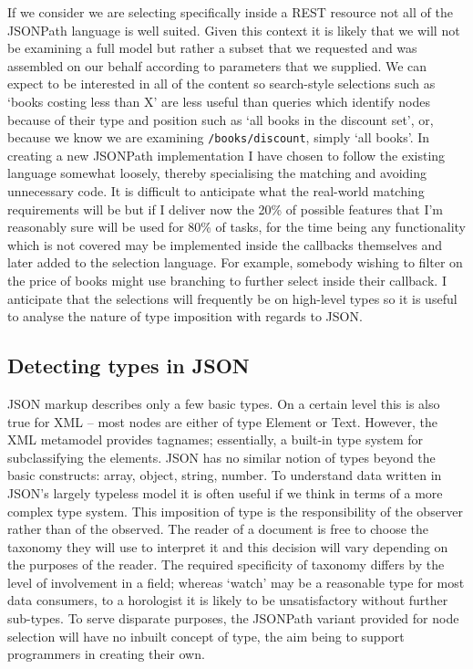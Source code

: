 \documentclass[12pt, ]{article}
\begin{document}
If we consider we are selecting specifically inside a REST resource not
all of the JSONPath language is well suited. Given this context it is
likely that we will not be examining a full model but rather a subset
that we requested and was assembled on our behalf according to
parameters that we supplied. We can expect to be interested in all of
the content so search-style selections such as `books costing less than
X' are less useful than queries which identify nodes because of their
type and position such as `all books in the discount set', or, because
we know we are examining \texttt{/books/discount}, simply `all books'.
In creating a new JSONPath implementation I have chosen to follow the
existing language somewhat loosely, thereby specialising the matching
and avoiding unnecessary code. It is difficult to anticipate what the
real-world matching requirements will be but if I deliver now the 20\%
of possible features that I'm reasonably sure will be used for 80\% of
tasks, for the time being any functionality which is not covered may be
implemented inside the callbacks themselves and later added to the
selection language. For example, somebody wishing to filter on the price
of books might use branching to further select inside their callback. I
anticipate that the selections will frequently be on high-level types so
it is useful to analyse the nature of type imposition with regards to
JSON.

\subsection{Detecting types in JSON}\label{detecting-types-in-json}

JSON markup describes only a few basic types. On a certain level this is
also true for XML -- most nodes are either of type Element or Text.
However, the XML metamodel provides tagnames; essentially, a built-in
type system for subclassifying the elements. JSON has no similar notion
of types beyond the basic constructs: array, object, string, number. To
understand data written in JSON's largely typeless model it is often
useful if we think in terms of a more complex type system. This
imposition of type is the responsibility of the observer rather than of
the observed. The reader of a document is free to choose the taxonomy
they will use to interpret it and this decision will vary depending on
the purposes of the reader. The required specificity of taxonomy differs
by the level of involvement in a field; whereas `watch' may be a
reasonable type for most data consumers, to a horologist it is likely to
be unsatisfactory without further sub-types. To serve disparate
purposes, the JSONPath variant provided for node selection will have no
inbuilt concept of type, the aim being to support programmers in
creating their own.
\end{document}
